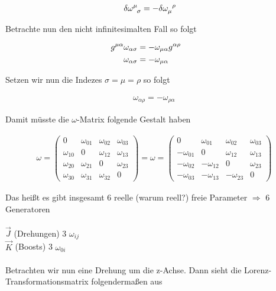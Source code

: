 \begin{align}
  \label{eq:32}
  \delta\omega^\mu_{\hphantom\mu \sigma} &= -\delta\omega^{\hphantom\mu \rho}_\mu 
\end{align}

Betrachte nun den nicht infinitesimalten Fall so folgt

\begin{align}
  \label{eq:33}
   g^{\mu\alpha} \omega_{\alpha \sigma}  &= -\omega_{\mu\alpha}g^{\alpha\rho} \qquad \notag \\
\omega_{\alpha \sigma}  &= -\omega_{\mu\alpha}
\end{align}

Setzen wir nun die Indezes \(\sigma=\mu = \rho\) so folgt

\begin{align}
  \label{eq:34}
  \boxed{ \omega_{\alpha \rho} = -\omega_{\rho\alpha} }
\end{align}

Damit müsste die \(\omega\)-Matrix folgende Gestalt haben 


\begin{align}
  \label{eq:29}
   \omega = \begin{pmatrix}0&\omega_{01}&\omega_{02}&\omega_{03}\\ \omega_{10}&0&\omega_{12}&\omega_{13}\\\omega_{20}&\omega_{21}&0&\omega_{23}\\ \omega_{30}&\omega_{31}&\omega_{32}&0\end{pmatrix} =
  \omega = \begin{pmatrix}0&\omega_{01}&\omega_{02}&\omega_{03}\\ -\omega_{01}&0&\omega_{12}&\omega_{13}\\-\omega_{02}&-\omega_{12}&0&\omega_{23}\\ -\omega_{03}&-\omega_{13}&-\omega_{23}&0\end{pmatrix}
\end{align}


Das heißt es gibt insgesamt 6 reelle (warum reell?) freie Parameter  \(\Rightarrow \) 6 Generatoren\\
\\
\(\vec J\) (Drehungen) 3 \(\omega_{ij}\)\\
\(\vec K\) (Boosts) 3 \(\omega_{0i}\)\\
\\


Betrachten wir nun eine Drehung um die z-Achse. Dann sieht die Lorenz-Transformationsmatrix folgendermaßen aus

